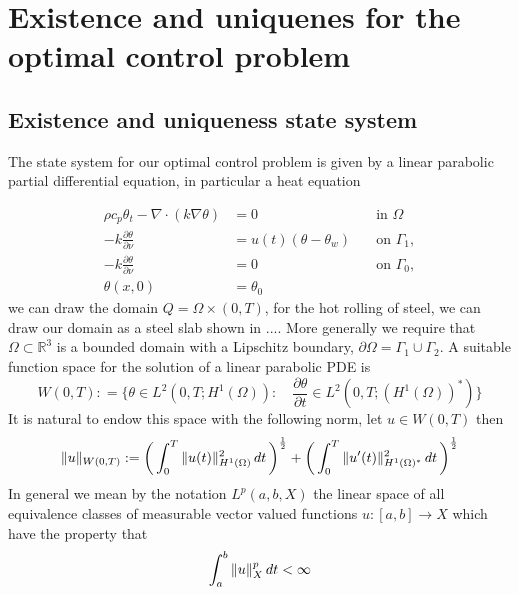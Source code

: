 \section{Existence and uniquenes for the optimal control problem}

\subsection{Existence and uniqueness state system}

The state system for our optimal control problem is given by a linear parabolic partial differential equation, in particular a heat equation

\begin{align*}
      \rho c_p \theta_t - \nabla \cdot (k \nabla \theta) &= 0 \quad &\text{in } \Omega \\
      -k \frac{\partial \theta}{\partial \nu} &= u(t) (\theta - \theta_w) \quad &\text{on } \Gamma_1, \\
      -k \frac{\partial \theta}{\partial \nu} &= 0 \quad &\text{on } \Gamma_0, \\
      \theta(x, 0) &= \theta_0 &
\end{align*}
we can draw the domain $Q = \Omega \times (0,T)$, for the hot rolling of steel, we can draw our domain as a steel slab shown in .... More generally we require that $\Omega \subset \mathbb{R}^3$ is a bounded domain with a Lipschitz boundary, $\partial \Omega = \Gamma_1 \cup \Gamma_2$. A suitable function space for the solution of a linear parabolic PDE is 
\begin{equation}
    \label{eq:funcSpace}
    W(0,T) : = \{ \theta \in L^2(0,T;H^1(\Omega)) : \quad \frac{\partial \theta}{\partial t} \in L^2(0,T;(H^1(\Omega))^{*}) \}
\end{equation}
It is natural to endow this space with the following norm, let $u \in W(0,T)$ then 
\begin{equation*}
    \|u\|_{W(0,T)} := \bigg (\int_{0}^T\|u(t)\|^2_{H^{1}(\Omega)}\mathop{dt} \bigg ) ^{\frac{1}{2}} + \bigg (\int_{0}^T\|u'(t)\|^2_{H^{1}(\Omega)^{*}}\mathop{dt} \bigg ) ^{\frac{1}{2}}
\end{equation*}
In general we mean by the notation $L^{p}(a,b,X)$ the linear space of all equivalence classes of measurable vector valued functions $u:[a,b] \rightarrow X$ which have the property that
\begin{equation*}
    \int_{a}^b\|u\|_X^p \mathop{dt}<\infty
\end{equation*}

